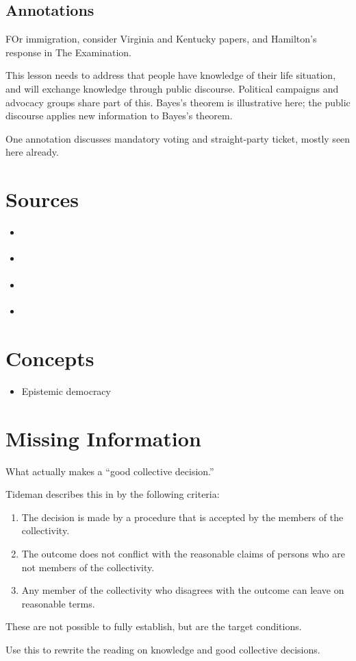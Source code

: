\subsection{Annotations}

FOr immigration, consider Virginia and Kentucky papers, and Hamilton's response in The Examination.

This lesson needs to address that people have knowledge of their life situation, and will exchange knowledge through public discourse.  Political campaigns and advocacy groups share part of this.  Bayes's theorem is illustrative here; the public discourse applies new information to Bayes's theorem.

One annotation discusses mandatory voting and straight-party ticket, mostly seen here already.

\section{Sources}

\begin{itemize}
    \item \autocite[Chapter 9]{Heckelman2015}
    \item \autocite{Rawls1997}
    \item \autocite{Estlund2008}
    \item \autocite{Swenson2007}
\end{itemize}

\section{Concepts}

\begin{itemize}
    \item Epistemic democracy
\end{itemize}

\section{Missing Information}

What actually makes a ``good collective decision.''

Tideman describes this in \autocite[69-72]{Tideman2006} by the following criteria:

\begin{enumerate}
    \item The decision is made by a procedure that is accepted by the members of the collectivity.
    \item The outcome does not conflict with the reasonable claims of persons who are not members of the collectivity.
    \item Any member of the collectivity who disagrees with the outcome can leave on reasonable terms.
\end{enumerate}

These are not possible to fully establish, but are the target conditions.

Use this to rewrite the reading on knowledge and good collective decisions.
